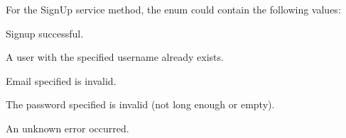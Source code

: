 For the SignUp service method, the enum could contain the following values:

\begin{my_description}
\item[Success] Signup successful.
\item[UsernameInUse] A user with the specified username already exists.
\item[InvalidEmail] Email specified is invalid.
\item[InvalidPassword] The password specified is invalid (not long enough or empty).
\item[Error] An unknown error occurred.
\end{my_description}